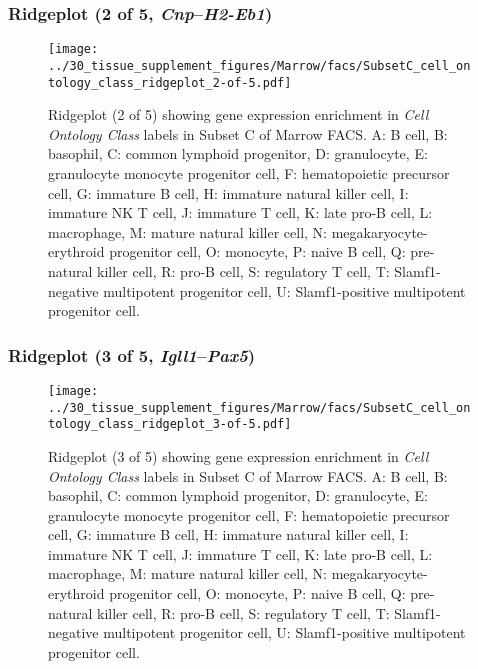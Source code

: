 \clearpage

\subsubsection{Ridgeplot (2 of 5, \emph{Cnp}--\emph{H2-Eb1})}
\begin{figure}[h]
\centering
\texttt{[image: ../30\_tissue\_supplement\_figures/Marrow/facs/SubsetC\_cell\_ontology\_class\_ridgeplot\_2-of-5.pdf]}

\caption{ Ridgeplot (2 of 5)  showing gene expression enrichment in \emph{Cell Ontology Class} labels in Subset C of Marrow FACS. A: B cell, B: basophil, C: common lymphoid progenitor, D: granulocyte, E: granulocyte monocyte progenitor cell, F: hematopoietic precursor cell, G: immature B cell, H: immature natural killer cell, I: immature NK T cell, J: immature T cell, K: late pro-B cell, L: macrophage, M: mature natural killer cell, N: megakaryocyte-erythroid progenitor cell, O: monocyte, P: naive B cell, Q: pre-natural killer cell, R: pro-B cell, S: regulatory T cell, T: Slamf1-negative multipotent progenitor cell, U: Slamf1-positive multipotent progenitor cell.}
\end{figure}


\clearpage

\subsubsection{Ridgeplot (3 of 5, \emph{Igll1}--\emph{Pax5})}
\begin{figure}[h]
\centering
\texttt{[image: ../30\_tissue\_supplement\_figures/Marrow/facs/SubsetC\_cell\_ontology\_class\_ridgeplot\_3-of-5.pdf]}

\caption{ Ridgeplot (3 of 5)  showing gene expression enrichment in \emph{Cell Ontology Class} labels in Subset C of Marrow FACS. A: B cell, B: basophil, C: common lymphoid progenitor, D: granulocyte, E: granulocyte monocyte progenitor cell, F: hematopoietic precursor cell, G: immature B cell, H: immature natural killer cell, I: immature NK T cell, J: immature T cell, K: late pro-B cell, L: macrophage, M: mature natural killer cell, N: megakaryocyte-erythroid progenitor cell, O: monocyte, P: naive B cell, Q: pre-natural killer cell, R: pro-B cell, S: regulatory T cell, T: Slamf1-negative multipotent progenitor cell, U: Slamf1-positive multipotent progenitor cell.}
\end{figure}


\clearpage

